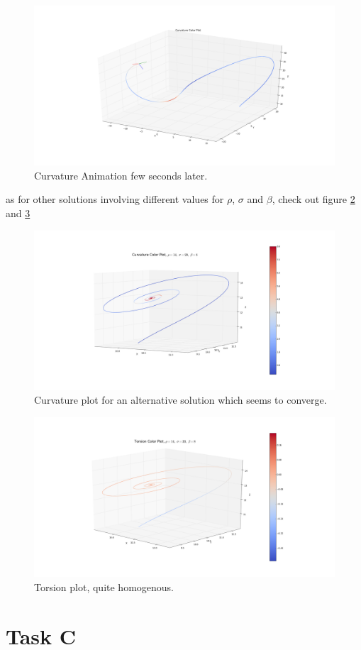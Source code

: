\documentclass[a4paper,10pt]{article}
\begin{document}
\begin{figure}
 \centering
 \includegraphics[width=\linewidth]{2c}
 \caption{Curvature Animation few seconds later.}
  \label{mult4}
\end{figure}
as for other solutions involving different values for $\rho$, $\sigma$ and $\beta$, check out figure \ref{ex1} and \ref{ex2}
\begin{figure}
 \centering
 \includegraphics[width=\linewidth]{ex1}
 \caption{Curvature plot for an alternative solution which seems to converge.}
  \label{ex1}  
\end{figure}

\begin{figure}
 \centering
 \includegraphics[width=\linewidth]{ex2}
 \caption{Torsion plot, quite homogenous.}
  \label{ex2}
\end{figure}


\section*{Task C}
\end{document}

